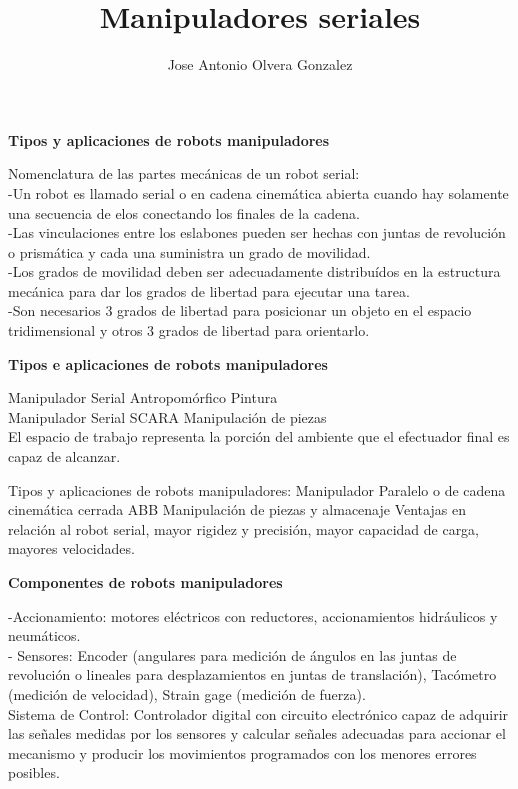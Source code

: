 \documentclass[12pt,letterpaper]{report}
\author{Jose Antonio Olvera Gonzalez }
\title{Manipuladores seriales }
\begin{document}
\begin{center}
\textbf{Tipos y aplicaciones de robots manipuladores}
\begin{flushleft}
Nomenclatura de las partes mecánicas de un robot serial: \\
-Un robot es llamado serial o en cadena cinemática abierta cuando hay solamente una secuencia de elos conectando los finales de la cadena.\\
-Las vinculaciones entre los eslabones pueden ser hechas con juntas de revolución o prismática y cada una suministra un grado de movilidad.\\
-Los grados de movilidad deben ser adecuadamente distribuídos en la estructura mecánica para dar los grados de libertad para ejecutar una tarea.\\
-Son necesarios 3 grados de libertad para posicionar un objeto en el espacio tridimensional y otros 3 grados de libertad para orientarlo. \\
\begin{center}
\textbf{ Tipos e aplicaciones de robots manipuladores}
\begin{flushleft}
Manipulador Serial Antropomórfico Pintura\\
Manipulador Serial SCARA Manipulación de piezas\\
El espacio de trabajo representa la porción del ambiente que el efectuador final es capaz de alcanzar.
\begin{flushleft}
Tipos y aplicaciones de robots manipuladores: Manipulador Paralelo o de cadena cinemática cerrada ABB Manipulación de piezas y almacenaje Ventajas en relación al robot serial, mayor rigidez y precisión, mayor capacidad de carga, mayores velocidades.
\begin{center}
\textbf{Componentes de robots manipuladores}
\begin{flushleft}
-Accionamiento: motores eléctricos con reductores, accionamientos hidráulicos y neumáticos.\\
- Sensores: Encoder (angulares para medición de ángulos en las juntas de revolución o lineales para desplazamientos en juntas de translación), Tacómetro (medición de velocidad), Strain gage (medición de fuerza).\\
 Sistema de Control: Controlador digital con circuito electrónico capaz de adquirir las señales medidas por los sensores y calcular señales adecuadas para accionar el mecanismo y producir los movimientos programados con los menores errores posibles.
 \begin{flushleft}

\end{flushleft}
\end{flushleft}
\end{center}
\end{flushleft}
\end{flushleft}
\end{center}
\end{flushleft}
\end{center}
\end{document}
